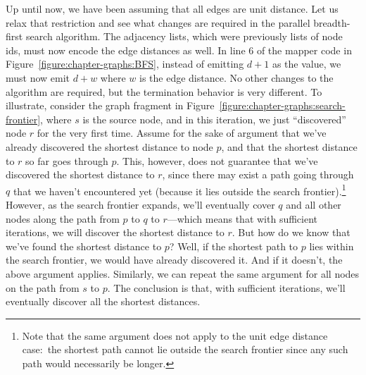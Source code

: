 Up until now, we have been assuming that all edges are unit distance.
Let us relax that restriction and see what changes are required in the
parallel breadth-first search algorithm.  The adjacency lists, which
were previously lists of node ids, must now encode the edge distances
as well.  In line 6 of the mapper code in
Figure~\ref{figure:chapter-graphs:BFS}, instead of emitting $d+1$ as
the value, we must now emit $d+w$ where $w$ is the edge distance.  No
other changes to the algorithm are required, but the termination
behavior is very different.  To illustrate, consider the graph
fragment in Figure~\ref{figure:chapter-graphs:search-frontier}, where
$s$ is the source node, and in this iteration, we just ``discovered''
node $r$ for the very first time.  Assume for the sake of argument
that we've already discovered the shortest distance to node $p$, and
that the shortest distance to $r$ so far goes through $p$.  This,
however, does not guarantee that we've discovered the shortest
distance to $r$, since there may exist a path going through $q$ that
we haven't encountered yet (because it lies outside the search
frontier).\footnote{Note that the same argument does not apply to the
  unit edge distance case:\ the shortest path cannot lie outside the
  search frontier since any such path would necessarily be longer.}
However, as the search frontier expands, we'll eventually cover $q$
and all other nodes along the path from $p$ to $q$ to $r$---which
means that with sufficient iterations, we will discover the shortest
distance to $r$.  But how do we know that we've found the shortest
distance to $p$?  Well, if the shortest path to $p$ lies within the
search frontier, we would have already discovered it.  And if it
doesn't, the above argument applies.  Similarly, we can repeat the
same argument for all nodes on the path from $s$ to $p$.  The
conclusion is that, with sufficient iterations, we'll eventually
discover all the shortest distances.

